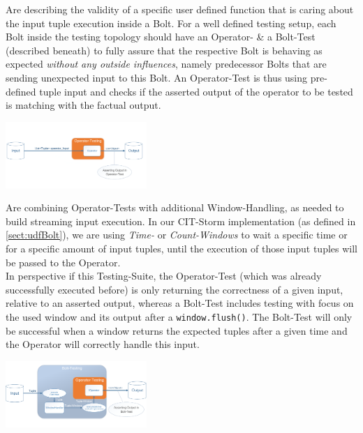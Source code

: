 	\begin{description}
		Are describing the validity of a specific user defined function that is caring about the input tuple execution inside a Bolt. For a well defined testing setup, each Bolt inside the testing topology should have an Operator- \& a Bolt-Test (described beneath) to fully assure that the respective Bolt is behaving as expected \textit{without any outside influences}, namely predecessor Bolts that are sending unexpected input to this Bolt. An Operator-Test is thus using pre-defined tuple input and checks if the asserted output of the operator to be tested is matching with the factual output.
		\begin{center}
			\includegraphics[width=0.4\textwidth]{./images/09_testing/OperatorTest.pdf}
		\end{center}

		
		Are combining Operator-Tests with additional Window-Handling, as needed to build streaming input execution. In our CIT-Storm implementation (as defined in \ref{sect:udfBolt}), we are using \textit{Time-} or \textit{Count-Windows} to wait a specific time or for a specific amount of input tuples, until the execution of those input tuples will be passed to the Operator. \\
		In perspective if this Testing-Suite, the Operator-Test (which was already successfully executed before) is only returning the correctness of a given input, relative to an asserted output, whereas a Bolt-Test includes testing with focus on the used window and its output after a \texttt{window.flush()}. The Bolt-Test will only be successful when a window returns the expected tuples after a given time and the Operator will correctly handle this input.
		\begin{center}
			\includegraphics[width=0.4\textwidth]{./images/09_testing/BoltTest.pdf}
		\end{center}
	 

\end{description}
